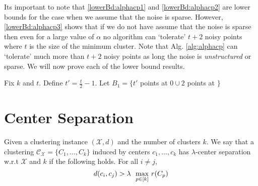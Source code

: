 \documentclass[11pt]{article}
\newcommand{\mc}{\mathcal}
\begin{document}
\noindent Its important to note that \ref{lowerBd:alphacp1} and \ref{lowerBd:alphacp2} are lower bounds for the case when we assume that the noise is sparse. However, \ref{lowerBd:alphacp3} shows that if we do not have assume that the noise is sparse then even for a large value of $\alpha$ no algorithm can `tolerate' $t+2$ noisy points where $t$ is the size of the minimum cluster. Note that Alg. \ref{alg:alphacp} can `tolerate' much more than $t+2$ noisy points as long the noise is {\it unstructured} or sparse. We will now prove each of the lower bound results.


\begin{theorem}
Fix $k$ and $t$. Define $t' = \frac{t}{2}-1$. Let $B_1 = \{t'$ points at $0 \cup 2$ points at $\}$
\end{theorem}

\section{Center Separation}

\begin{definition}
\label{defn:lambdacs}
Given a clustering instance $(\mc X, d)$ and the number of clusters $k$. We say that a clustering $\mc C_{\mc X} = \{C_1, \ldots, C_k\}$ induced by centers $c_1, \ldots, c_k$ has $\lambda$-center separation w.r.t $\mc X$ and $k$ if the following holds. For all $i\neq j$, 
$$d(c_i, c_j) > \lambda \enspace\max_{p \in [k]} \thinspace r(C_p)$$
\end{definition}
\end{document}

